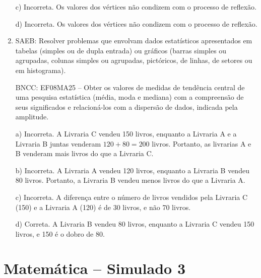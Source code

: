 \begin{enumerate}
c) Incorreta. Os valores dos vértices não condizem com o processo
de reflexão.

d) Incorreta. Os valores dos vértices não condizem com o processo
de reflexão.

\item SAEB: Resolver problemas que envolvam dados estatísticos apresentados em
tabelas (simples ou de dupla entrada) ou gráficos (barras simples ou
agrupadas, colunas simples ou agrupadas, pictóricos, de linhas, de
setores ou em histograma).

BNCC: EF08MA25 -- Obter os valores de medidas de tendência central de
uma pesquisa estatística (média, moda e mediana) com a compreensão de
seus significados e relacioná-los com a dispersão de dados, indicada
pela amplitude.

a) Incorreta. A Livraria C vendeu 150 livros, enquanto a Livraria A
e a Livraria B juntas venderam $120 + 80 = 200$ livros. Portanto, as
livrarias A e B venderam mais livros do que a Livraria C.

b) Incorreta. A Livraria A vendeu 120 livros, enquanto a Livraria B
vendeu 80 livros. Portanto, a Livraria B vendeu menos livros do que a
Livraria A.

c) Incorreta. A diferença entre o número de livros vendidos pela
Livraria C (150) e a Livraria A (120) é de 30 livros, e não 70 livros.

d) Correta. A Livraria B vendeu 80 livros, enquanto a Livraria C
vendeu 150 livros, e 150 é o dobro de 80.
\end{enumerate}


\section*{Matemática – Simulado 3}

